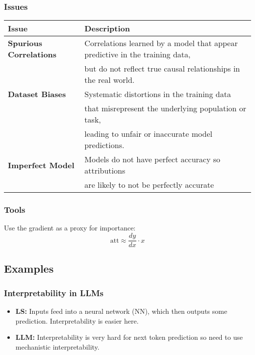 \subsubsection{Issues}
\begin{summary}
    \begin{center}
        \begin{tabular}{ll}
            \toprule
            \textbf{Issue} & \textbf{Description} \\
            \midrule
            \textbf{Spurious Correlations} & Correlations learned by a model that appear predictive in the training data, \\
            & but do not reflect true causal relationships in the real world. \\
            \midrule
            \textbf{Dataset Biases} & Systematic distortions in the training data \\
            & that misrepresent the underlying population or task, \\
            & leading to unfair or inaccurate model predictions. \\
            \midrule
            \textbf{Imperfect Model} & Models do not have perfect accuracy so attributions \\
            & are likely to not be perfectly accurate \\
            \bottomrule
        \end{tabular}
    \end{center}
\end{summary}
\newpage

\subsubsection{Tools}
\begin{summary}
    Use the gradient as a proxy for importance:
    \begin{equation*}
        \text{att} \approx \frac{dy}{dx} \cdot x
    \end{equation*}
\end{summary}
\newpage

\subsection{Examples}
\subsubsection{Interpretability in LLMs}
\begin{example}
    \begin{itemize}
        \item \textbf{LS:} Inputs feed into a neural network (NN), which then outputs some prediction. Interpretability is easier here.
        \item \textbf{LLM:} Interpretability is very hard for next token prediction so need to use mechanistic interpretability.
    \end{itemize}
\end{example}
\newpage

